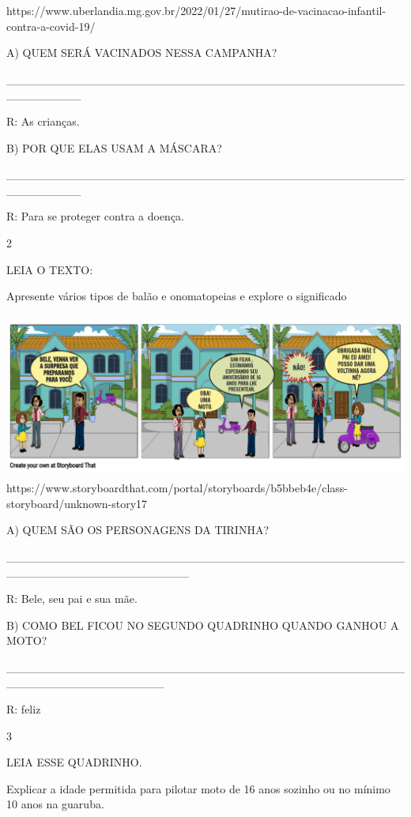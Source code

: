 {{{{{{https://www.uberlandia.mg.gov.br/2022/01/27/mutirao-de-vacinacao-infantil-contra-a-covid-19/

A) QUEM SERÁ VACINADOS NESSA CAMPANHA?

\_\_\_\_\_\_\_\_\_\_\_\_\_\_\_\_\_\_\_\_\_\_\_\_\_\_\_\_\_\_\_\_\_\_\_\_\_\_\_\_\_\_\_\_\_\_\_\_\_\_\_\_\_\_\_\_\_

R: As crianças.

B) POR QUE ELAS USAM A MÁSCARA?

\_\_\_\_\_\_\_\_\_\_\_\_\_\_\_\_\_\_\_\_\_\_\_\_\_\_\_\_\_\_\_\_\_\_\_\_\_\_\_\_\_\_\_\_\_\_\_\_\_\_\_\_\_\_\_\_\_

R: Para se proteger contra a doença.

\num{2}

LEIA O TEXTO:

Apresente vários tipos de balão e onomatopeias e explore o significado

\includegraphics[width=5.56806in,height=2.13216in]{media/image129.png}https://www.storyboardthat.com/portal/storyboards/b5bbeb4e/class-storyboard/unknown-story17

A) QUEM SÃO OS PERSONAGENS DA TIRINHA?

\_\_\_\_\_\_\_\_\_\_\_\_\_\_\_\_\_\_\_\_\_\_\_\_\_\_\_\_\_\_\_\_\_\_\_\_\_\_\_\_\_\_\_\_\_\_\_\_\_\_\_\_\_\_\_\_\_\_\_\_\_\_\_\_\_\_\_\_\_\_

R: Bele, seu pai e sua mãe.

B) COMO BEL FICOU NO SEGUNDO QUADRINHO QUANDO GANHOU A MOTO?

\_\_\_\_\_\_\_\_\_\_\_\_\_\_\_\_\_\_\_\_\_\_\_\_\_\_\_\_\_\_\_\_\_\_\_\_\_\_\_\_\_\_\_\_\_\_\_\_\_\_\_\_\_\_\_\_\_\_\_\_\_\_\_\_\_\_\_

R: feliz

\num{3}

LEIA ESSE QUADRINHO.

Explicar a idade permitida para pilotar moto de 16 anos sozinho ou no
mínimo 10 anos na guaruba.

}}}}}}
